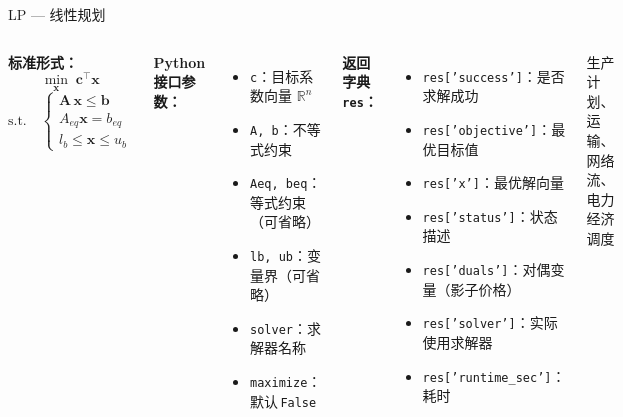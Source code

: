 \documentclass[10pt,aspectratio=169]{beamer}
\newcommand{\vx}{\bm{x}}
\newcommand{\vc}{\bm{c}}
\newcommand{\vb}{\bm{b}}
\newcommand{\mA}{\bm{A}}
\newcommand{\R}{\mathbb{R}}
\begin{document}
\begin{frame}{LP — 线性规划}
  \begin{columns}[T]
    \textbf{标准形式：}
    \[
      \min_{\vx}\; \vc^{\top}\vx
    \]
    \[
      \text{s.t.}\quad
      \begin{cases}
        \mA\,\vx \le \vb \\
        A_{eq}\vx = b_{eq} \\
        l_b \le \vx \le u_b
      \end{cases}
    \]

    \textbf{Python 接口参数：}
    \begin{itemize}
      \item \texttt{c}：目标系数向量 $\R^n$
      \item \texttt{A, b}：不等式约束
      \item \texttt{Aeq, beq}：等式约束（可省略）
      \item \texttt{lb, ub}：变量界（可省略）
      \item \texttt{solver}：求解器名称
      \item \texttt{maximize}：默认\,\texttt{False}
    \end{itemize}

    \textbf{返回字典 \texttt{res}：}
    \begin{itemize}
      \item \texttt{res['success']}：是否求解成功
      \item \texttt{res['objective']}：最优目标值
      \item \texttt{res['x']}：最优解向量
      \item \texttt{res['status']}：状态描述
      \item \texttt{res['duals']}：对偶变量（影子价格）
      \item \texttt{res['solver']}：实际使用求解器
      \item \texttt{res['runtime\_sec']}：耗时
    \end{itemize}

    \vspace{6pt}
    \begin{tcolorbox}[mybox,title=应用示例]
      \footnotesize
      生产计划、运输、网络流、电力经济调度
    \end{tcolorbox}
  \end{columns}
\end{frame}
\end{document}
